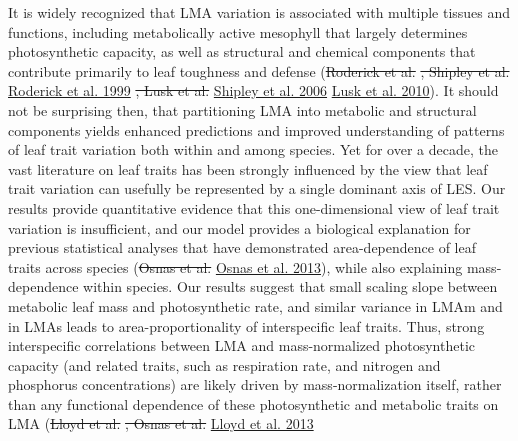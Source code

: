 \documentclass[
  12pt,
]{article}
\providecommand{\DIFaddtex}[1]{{\protect\color{blue}\uwave{#1}}} %
\providecommand{\DIFdeltex}[1]{{\protect\color{red}\sout{#1}}}                      %
\providecommand{\DIFaddbegin}{} %
\providecommand{\DIFaddend}{} %
\providecommand{\DIFdelbegin}{} %
\providecommand{\DIFdelend}{} %
\providecommand{\DIFadd}[1]{\texorpdfstring{\DIFaddtex{#1}}{#1}} %
\providecommand{\DIFdel}[1]{\texorpdfstring{\DIFdeltex{#1}}{}} %
\newcommand{\DIFscaledelfig}{0.5}
\newlength{\DIFdelgraphicswidth} %
\newlength{\DIFdelgraphicsheight} %
\newcommand{\DIFaddincludegraphics}[2][]{{\color{blue}\fbox{\DIFOincludegraphics[#1]{#2}}}} %
\newcommand{\DIFdelincludegraphics}[2][]{%
\sbox{\DIFdelgraphicsbox}{\DIFOincludegraphics[#1]{#2}}%
\settoboxwidth{\DIFdelgraphicswidth}{\DIFdelgraphicsbox} %
\settoboxtotalheight{\DIFdelgraphicsheight}{\DIFdelgraphicsbox} %
\scalebox{\DIFscaledelfig}{%
\parbox[b]{\DIFdelgraphicswidth}{\usebox{\DIFdelgraphicsbox}\\[-\baselineskip] \rule{\DIFdelgraphicswidth}{0em}}\llap{\resizebox{\DIFdelgraphicswidth}{\DIFdelgraphicsheight}{%
\setlength{\unitlength}{\DIFdelgraphicswidth}%
\begin{picture}(1,1)%
\thicklines\linethickness{2pt} %
{\color[rgb]{1,0,0}\put(0,0){\framebox(1,1){}}}%
{\color[rgb]{1,0,0}\put(0,0){\line( 1,1){1}}}%
{\color[rgb]{1,0,0}\put(0,1){\line(1,-1){1}}}%
\end{picture}%
}\hspace*{3pt}}} %
} %
\DeclareRobustCommand{\DIFaddbegin}{\DIFOaddbegin \let\includegraphics\DIFaddincludegraphics} %
\DeclareRobustCommand{\DIFaddend}{\DIFOaddend \let\includegraphics\DIFOincludegraphics} %
\DeclareRobustCommand{\DIFdelbegin}{\DIFOdelbegin \let\includegraphics\DIFdelincludegraphics} %
\DeclareRobustCommand{\DIFdelend}{\DIFOaddend \let\includegraphics\DIFOincludegraphics} %
\begin{document}
It is widely recognized that LMA variation is associated with multiple tissues and functions, including metabolically active mesophyll that largely determines photosynthetic capacity, as well as structural and chemical components that contribute primarily to leaf toughness and defense (\DIFdelbegin \DIFdel{Roderick et al. }\DIFdelend \protect\DIFdelbegin %
\DIFdel{, Shipley et al. }\DIFdelend \DIFaddbegin \hyperlink{ref-Roderick1999}{Roderick et al. 1999}\DIFadd{, }\DIFaddend \protect\DIFdelbegin %
\DIFdel{, Lusk et al. }\DIFdelend \DIFaddbegin \hyperlink{ref-Shipley2006}{Shipley et al. 2006}\DIFadd{, }\DIFaddend \protect\DIFdelbegin %
\DIFdelend \DIFaddbegin \hyperlink{ref-Lusk2010}{Lusk et al. 2010}\DIFaddend ).
It should not be surprising then, that partitioning LMA into metabolic and structural components yields enhanced predictions and improved understanding of patterns of leaf trait variation both within and among species.
Yet for over a decade, the vast literature on leaf traits has been strongly influenced by the view that leaf trait variation can usefully be represented by a single dominant axis of LES.
Our results provide quantitative evidence that this one-dimensional view of leaf trait variation is insufficient, and our model provides a biological explanation for previous statistical analyses that have demonstrated area-dependence of leaf traits across species (\DIFdelbegin \DIFdel{Osnas et al. }\DIFdelend \protect\DIFdelbegin %
\DIFdelend \DIFaddbegin \hyperlink{ref-Osnas2013}{Osnas et al. 2013}\DIFaddend ), while also explaining mass-dependence within species. Our results suggest that small scaling slope between metabolic leaf mass and photosynthetic rate, and similar variance in LMAm and in LMAs leads to area-proportionality of interspecific leaf traits.
Thus, strong interspecific correlations between LMA and mass-normalized photosynthetic capacity (and related traits, such as respiration rate, and nitrogen and phosphorus concentrations) are likely driven by mass-normalization itself, rather than any functional dependence of these photosynthetic and metabolic traits on LMA (\DIFdelbegin \DIFdel{Lloyd et al. }\DIFdelend \protect\DIFdelbegin %
\DIFdel{, Osnas et al. }\DIFdelend \DIFaddbegin \hyperlink{ref-Lloyd2013}{Lloyd et al. 2013}\DIFadd{, }\DIFaddend \protect\DIFdelbegin %
\end{document}

